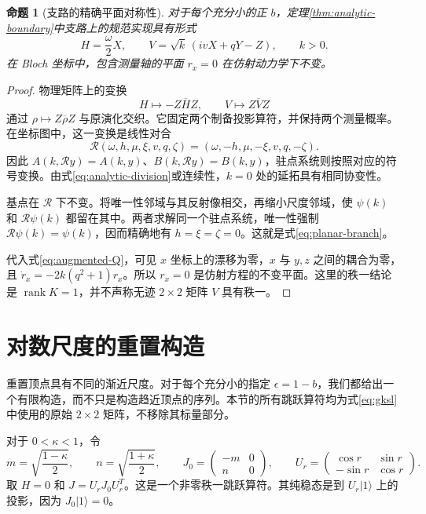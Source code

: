 \documentclass[UTF8,11pt,a4paper,fontset=fandol]{ctexart}
\newtheorem{proposition}[theorem]{命题}
\theoremstyle{definition}
\theoremstyle{remark}
\DeclareMathOperator{\rank}{rank}
\begin{document}
\begin{proposition}[支路的精确平面对称性]\label{prop:planarity}
对于每个充分小的正 \(b\)，定理\ref{thm:analytic-boundary}中支路上的规范实现具有形式
\begin{equation}\label{eq:planar-branch}
 H=\frac\omega2X,\qquad
 V=\sqrt{k}\,(ivX+qY-Z),\qquad k>0.
\end{equation}
在 Bloch 坐标中，包含测量轴的平面 \(r_x=0\) 在仿射动力学下不变。
\end{proposition}
\begin{proof}
物理矩阵上的变换
\[
 H\longmapsto-Z\overline HZ,\qquad V\longmapsto Z\overline VZ
\]
通过 \(\rho\mapsto Z\overline\rho Z\) 与原演化交织。它固定两个制备投影算符，并保持两个测量概率。在坐标图中，这一变换是线性对合
\[
 \mathcal R(\omega,h,\mu,\xi,v,q,\zeta)
 =(\omega,-h,\mu,-\xi,v,q,-\zeta).
\]
因此 \(A(k,\mathcal Ry)=A(k,y)\)、\(B(k,\mathcal Ry)=B(k,y)\)，驻点系统则按照对应的符号变换。由式\eqref{eq:analytic-division}或连续性，\(k=0\) 处的延拓具有相同协变性。

基点在 \(\mathcal R\) 下不变。将唯一性邻域与其反射像相交，再缩小尺度邻域，使 \(\psi(k)\) 和 \(\mathcal R\psi(k)\) 都留在其中。两者求解同一个驻点系统，唯一性强制 \(\mathcal R\psi(k)=\psi(k)\)，因而精确地有 \(h=\xi=\zeta=0\)。这就是式\eqref{eq:planar-branch}。

代入式\eqref{eq:augmented-Q}，可见 \(x\) 坐标上的漂移为零，\(x\) 与 \(y,z\) 之间的耦合为零，且
\(\dot r_x=-2k(q^2+1)r_x\)。所以 \(r_x=0\) 是仿射方程的不变平面。这里的秩一结论是 \(\rank K=1\)，并不声称无迹 \(2\times2\) 矩阵 \(V\) 具有秩一。
\end{proof}



\section{对数尺度的重置构造}\label{sec:reset}

重置顶点具有不同的渐近尺度。对于每个充分小的指定 \(\epsilon=1-b\)，我们都给出一个有限构造，而不只是构造趋近顶点的序列。本节的所有跳跃算符均为式\eqref{eq:gksl}中使用的原始 \(2\times2\) 矩阵，不移除其标量部分。

对于 \(0<\kappa<1\)，令
\begin{equation}\label{eq:reset-jump}
 m=\sqrt{\frac{1-\kappa}{2}},\qquad n=\sqrt{\frac{1+\kappa}{2}},\qquad
 J_0=\begin{pmatrix}-m&0\\n&0\end{pmatrix},\qquad
 U_r=\begin{pmatrix}\cos r&\sin r\\-\sin r&\cos r\end{pmatrix}.
\end{equation}
取 \(H=0\) 和 \(J=U_rJ_0U_r^T\)。这是一个非零秩一跳跃算符。其纯稳态是到 \(U_r|1\rangle\) 上的投影，因为 \(J_0|1\rangle=0\)。
\end{document}
